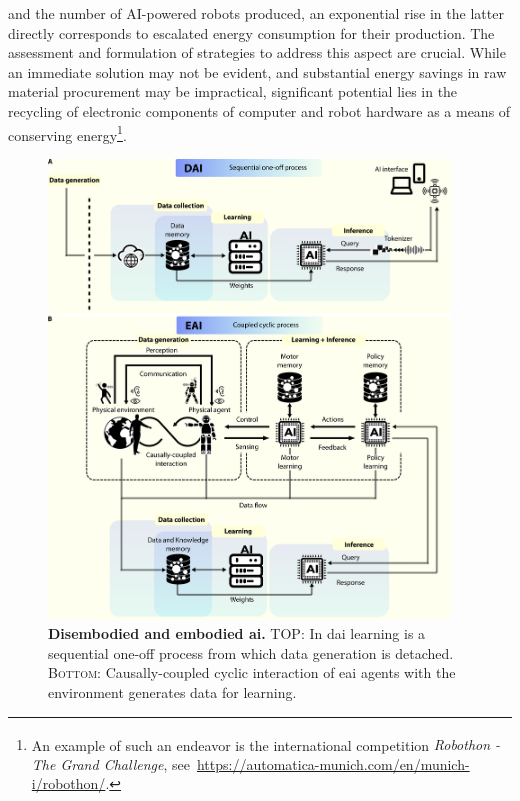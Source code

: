 \documentclass[12pt]{article}
\begin{document}
and the number of AI-powered robots produced, an exponential rise in the latter directly corresponds to escalated energy consumption for their production. The assessment and formulation of strategies to address this aspect are crucial. While an immediate solution may not be evident, and substantial energy savings in raw material procurement may be impractical, significant potential lies in the recycling of electronic components of computer and robot hardware as a means of conserving energy\footnote{An example of such an endeavor is the international competition \textit{Robothon\textsuperscript{\textregistered} - The Grand Challenge}, see~\url{https://automatica-munich.com/en/munich-i/robothon/}.}.

\begin{figure}[t!]
	\centering
	\includegraphics[width=0.95\textwidth]{eai_and_dai_concept_figure.png}
	\caption[] {\label{fig:eai_and_dai_concept_figure} \textbf{Disembodied and embodied \ac{ai}.} \textsc{TOP}: In \ac{dai} learning is a sequential one-off process from which data generation is detached. \textsc{Bottom}: Causally-coupled cyclic interaction of \ac{eai} agents with the environment generates data for learning.}
\end{figure}
\end{document}
